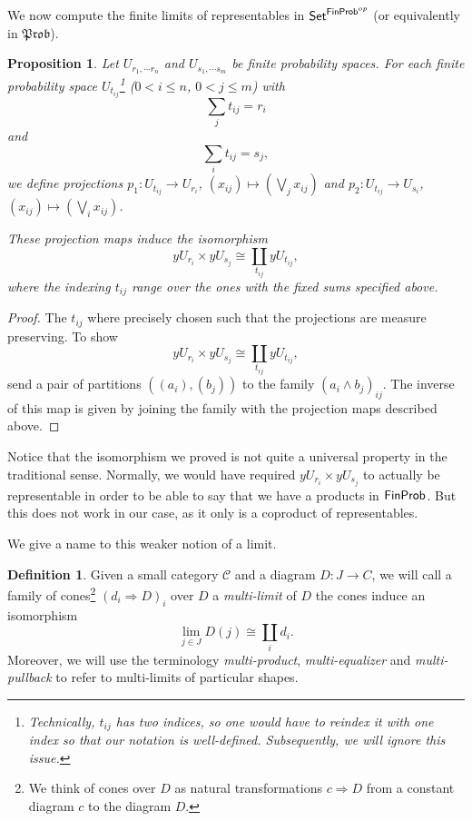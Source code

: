 \documentclass[a4paper]{amsproc}
\theoremstyle{plain}
\newtheorem{proposition}[theorem]{Proposition}
\theoremstyle{definition}
\newtheorem{definition}[theorem]{Definition}
\theoremstyle{remark}
\numberwithin{equation}{section}
\newcommand{\y}{\textit{y}}
\DeclareMathOperator*{\limit}{lim}
\newcommand{\Set}{\textup{\textsf{Set}}}
\newcommand{\FinProb}{\textup{\textsf{FinProb}}}
\newcommand{\C}{\mathcal{C}}
\newcommand{\Prob}{\mathfrak{Prob}}
\begin{document}
We now compute the finite limits of representables in $\Set^{\FinProb^{op}}$ (or equivalently in $\Prob$).

\begin{proposition} \label{multi-product}
    Let $U_{r_1, \cdots r_n}$ and $U_{s_1, \cdots s_m}$ be finite probability spaces. For each finite probability space $U_{t_{ij}}$\footnote{Technically, $t_{ij}$ has two indices, so one would have to reindex it with one index so that our notation is well-defined. Subsequently, we will ignore this issue.} ($0 < i \leq n$, $0 < j \leq m$) with
    \[
        \sum_j t_{ij} = r_i
    \]
    and
    \[
        \sum_i t_{ij} = s_j ,
    \]
    we define projections $p_1: U_{t_{ij}} \to U_{r_i}$, $(x_{ij}) \mapsto (\bigvee_j x_{ij})$ and $p_2: U_{t_{ij}} \to U_{s_i}$, $(x_{ij}) \mapsto (\bigvee_i x_{ij})$.

    These projection maps induce the isomorphism
    \[
    \y U_{r_i} \times \y U_{s_j} \cong \coprod_{t_{ij}} \y U_{t_{ij}} ,
    \]
    where the indexing $t_{ij}$ range over the ones with the fixed sums specified above.
\end{proposition}
\begin{proof}
    The $t_{ij}$ where precisely chosen such that the projections are measure preserving. To show
    \[
    \y U_{r_i} \times \y U_{s_j} \cong \coprod_{t_{ij}} \y U_{t_{ij}} ,
    \]
    send a pair of partitions $((a_i),(b_j))$ to the family $(a_i \wedge b_j)_{ij}$. The inverse of this map is given by joining the family with the projection maps described above.
\end{proof}

Notice that the isomorphism we proved is not quite a universal property in the traditional sense. Normally, we would have required $\y U_{r_i} \times \y U_{s_j}$ to actually be representable in order to be able to say that we have a products in $\FinProb$. But this does not work in our case, as it only is a coproduct of representables.

We give a name to this weaker notion of a limit.

\begin{definition}
    Given a small category $\C$ and a diagram $D: J \to C$, we will call a family of cones\footnote{We think of cones over $D$ as natural transformations $c \Rightarrow D$ from a constant diagram $c$ to the diagram $D$.} $(d_i \Rightarrow D)_i$ over $D$ a \emph{multi-limit} of $D$ the cones induce an isomorphism
    \[
        \limit_{j \in J} D(j) \cong \coprod_i d_i .
    \]
    Moreover, we will use the terminology \emph{multi-product}, \emph{multi-equalizer} and \emph{multi-pullback} to refer to multi-limits of particular shapes.
\end{definition}
\end{document}
